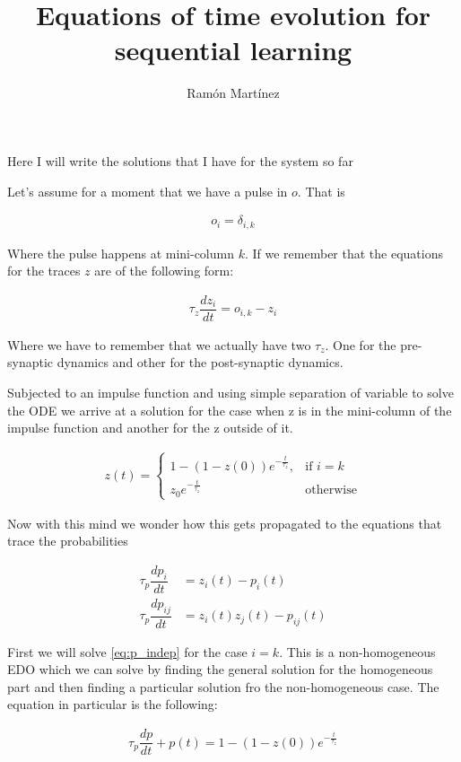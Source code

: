 \documentclass[10pt,a4paper]{article}
\author{Ram\'on Mart\'inez}
\title{Equations of time evolution for sequential learning}
\begin{document}
\maketitle
Here I will write the solutions that I have for the system so far

Let's assume for a moment that we have a pulse in $o$. That is  

\begin{align*}
o_i = \delta_{i, k} 
\end{align*}

Where the pulse happens at mini-column $k$. If we remember that the equations for the traces $z$ are of the following form:

\begin{align}
\tau_z \dfrac{dz_i}{dt} = o_{i, k} - z_{i} 
\end{align}

Where we have to remember that we actually have two $\tau_z$. One for the pre-synaptic dynamics and other for the post-synaptic dynamics.

Subjected to an impulse function and using simple separation of variable to solve the ODE we arrive at a solution for the case when z is in the mini-column of the impulse function and another for the z outside of it.

\begin{align}
z(t) = \begin{cases}
    1 - (1 - z(0)) e^{-\frac{t}{\tau_z}} , & \text{if } i=k\\   \label{sol:z}
    z_0 e^{-\frac{t}{\tau_z}}      & \text{otherwise}  
\end{cases}
\end{align}

Now with this mind we wonder how this gets propagated to the equations that trace the probabilities 

\begin{align}
\tau_p \dfrac{dp_i}{dt} &= z_i(t) - p_i(t) \label{eq:p_indep}  \\  
\tau_p \dfrac{dp_{ij}}{dt} &= z_i(t) z_j(t) - p_{ij}(t)  \label{eq:p_joint}
\end{align}

First we will solve \eqref{eq:p_indep} for the case $i=k$. This is a non-homogeneous EDO which we can solve by finding the general solution for the homogeneous part and then finding a particular solution fro the non-homogeneous case. The equation in particular is the following:

\begin{align*}
\tau_p \dfrac{dp}{dt} + p(t) = 1 - (1 - z(0)) e^{-\frac{t}{\tau_z}} 
\end{align*}
\end{document}
